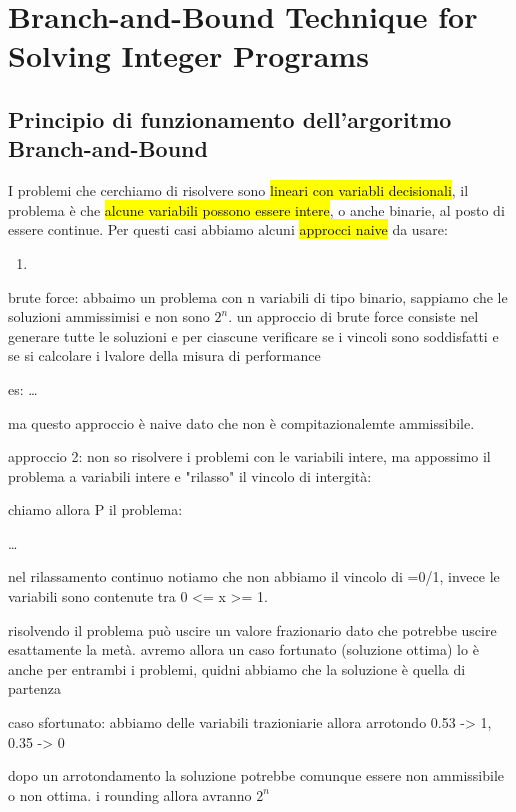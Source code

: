 \newpage
\section{Branch-and-Bound Technique for Solving Integer Programs}

\subsection{Principio di funzionamento dell'argoritmo Branch-and-Bound}

I problemi che cerchiamo di risolvere sono \hl{lineari con variabli decisionali}, il problema è che \hl{alcune variabili possono essere intere}, o anche binarie, al posto di essere continue. Per questi casi abbiamo alcuni \hl{approcci naive} da usare:

\begin{enumerate}
    \item 
\end{enumerate}

brute force:
abbaimo un problema con n variabili di tipo binario, sappiamo che le soluzioni ammissimisi e non sono $2^n$. un approccio di brute force consiste nel generare tutte le soluzioni e per ciascune verificare se i vincoli sono soddisfatti e se si calcolare i lvalore della misura di performance

es:
\dots

ma questo approccio è naive dato che non è compitazionalemte ammissibile.

approccio 2:
non so risolvere i problemi con le variabili intere, ma appossimo il problema a variabili intere e "rilasso" il vincolo di intergità:

chiamo allora P  il problema:

\dots

nel rilassamento continuo notiamo che non abbiamo il vincolo di =0/1, invece le variabili sono contenute tra 0 <= x >= 1.

risolvendo il problema può uscire un valore frazionario dato che potrebbe uscire esattamente la metà. avremo allora un caso fortunato (soluzione ottima) lo è anche per entrambi i problemi, quidni abbiamo che la soluzione è quella di partenza


caso sfortunato: abbiamo delle variabili trazioniarie allora arrotondo 0.53 -> 1, 0.35 -> 0

dopo un arrotondamento la soluzione potrebbe comunque essere non ammissibile o non ottima. i rounding allora avranno $2^{n}$



